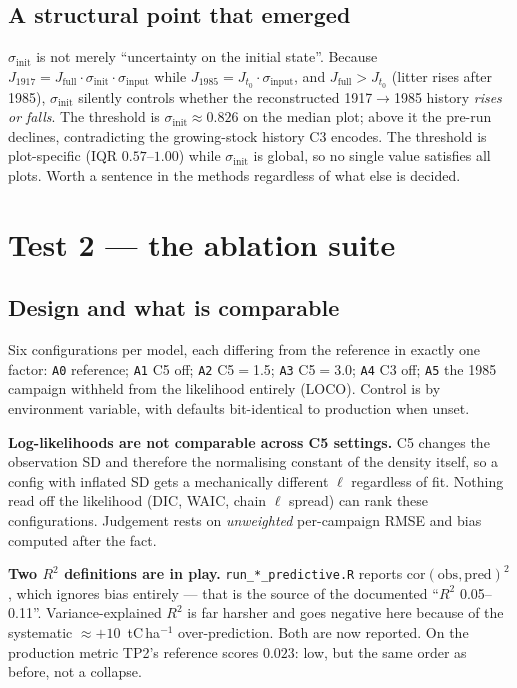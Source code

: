 \documentclass[11pt]{article}
\newcommand{\sinit}{\sigma_{\mathrm{init}}}
\newcommand{\sinput}{\sigma_{\mathrm{input}}}
\begin{document}
\subsection{A structural point that emerged}
$\sinit$ is not merely ``uncertainty on the initial state''. Because
$J_{1917} = J_{\mathrm{full}}\!\cdot\!\sinit\!\cdot\!\sinput$ while
$J_{1985} = J_{t_0}\!\cdot\!\sinput$, and $J_{\mathrm{full}} > J_{t_0}$ (litter rises after
1985), $\sinit$ silently controls whether the reconstructed 1917$\rightarrow$1985 history
\emph{rises or falls}. The threshold is $\sinit \approx 0.826$ on the median plot; above it the
pre-run declines, contradicting the growing-stock history C3 encodes. The threshold is
plot-specific (IQR $0.57$--$1.00$) while $\sinit$ is global, so no single value satisfies all
plots. Worth a sentence in the methods regardless of what else is decided.

\section{Test 2 --- the ablation suite}

\subsection{Design and what is comparable}
Six configurations per model, each differing from the reference in exactly one factor:
\texttt{A0} reference; \texttt{A1} C5 off; \texttt{A2} C5$=$1.5; \texttt{A3} C5$=$3.0;
\texttt{A4} C3 off; \texttt{A5} the 1985 campaign withheld from the likelihood entirely (LOCO).
Control is by environment variable, with defaults bit-identical to production when unset.

\begin{caveat}
\textbf{Log-likelihoods are not comparable across C5 settings.} C5 changes the observation SD
and therefore the normalising constant of the density itself, so a config with inflated SD gets
a mechanically different $\ell$ regardless of fit. Nothing read off the likelihood (DIC, WAIC,
chain $\ell$ spread) can rank these configurations. Judgement rests on \emph{unweighted}
per-campaign RMSE and bias computed after the fact.

\textbf{Two $R^2$ definitions are in play.} \texttt{run\_*\_predictive.R} reports
$\mathrm{cor}(\text{obs},\text{pred})^2$, which ignores bias entirely --- that is the source of
the documented ``$R^2$ 0.05--0.11''. Variance-explained $R^2$ is far harsher and goes negative
here because of the systematic $\approx +10$~tC\,ha$^{-1}$ over-prediction. Both are now
reported. On the production metric TP2's reference scores $0.023$: low, but the same order as
before, not a collapse.
\end{caveat}
\end{document}

